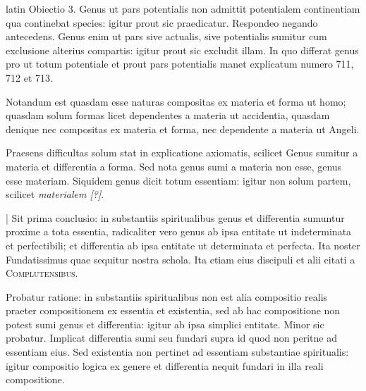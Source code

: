 \begin{otherlanguage*}{latin}
\pstart
 Obiectio 3. Genus ut pars potentialis non admittit potentialem continentiam qua continebat species: igitur prout sic praedicatur. Respondeo negando antecedens. Genus enim ut pars sive actualis, sive potentialis sumitur cum exclusione alterius compartis: igitur prout sic excludit illam. In quo differat genus pro ut totum potentiale et prout pars potentialis manet explicatum numero 711, 712 et 713. 
\pend

        \pstart
        \pend
      
\pstart
 Notandum est quasdam esse naturas compositas ex materia et forma ut homo; quasdam solum formas licet dependentes a materia ut accidentia, quasdam denique nec compositas ex materia et forma, nec dependente a materia ut Angeli. 
\pend

\pstart
 Praesens difficultas solum stat in explicatione axiomatis, scilicet Genus sumitur a materia et differentia a forma. Sed nota genus sumi a materia non esse, genus esse materiam. Siquidem genus dicit totum essentiam: igitur non solum partem, scilicet \emph{materialem [?]}. 
\pend

\pstart
 \textnormal{|} Sit prima conclusio: in substantiis spiritualibus genus et differentia sumuntur proxime a tota essentia, radicaliter vero genus ab ipsa entitate ut indeterminata et perfectibili; et differentia ab ipsa entitate ut determinata et perfecta. Ita noster Fundatissimus  quae sequitur nostra schola. Ita etiam  eius discipuli et alii citati a \textsc{Complutensibus}\index[persons]{}. 
\pend

\pstart
 Probatur ratione: in substantiis spiritualibus non est alia compositio realis praeter compositionem ex essentia et existentia, sed ab hac compositione non potest sumi genus et differentia: igitur ab ipsa simplici entitate. Minor sic probatur. Implicat differentia sumi seu fundari supra id quod non peritne ad essentiam eius. Sed existentia non pertinet ad essentiam substantiae spiritualis: igitur compositio logica ex genere et differentia nequit fundari in illa reali compositione. 
\pend


\end{otherlanguage*}

